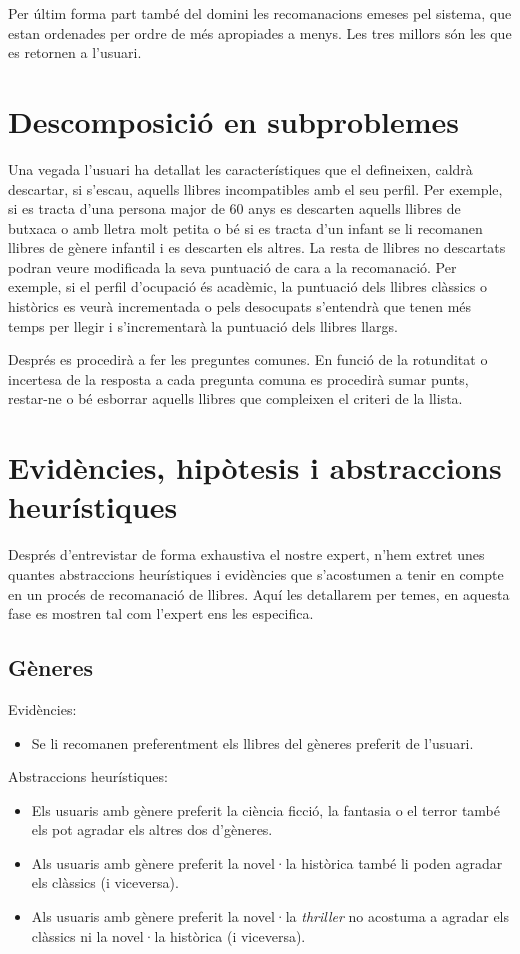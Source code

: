Per últim forma part també del domini les recomanacions emeses pel sistema, que estan ordenades per ordre de més apropiades a menys. Les tres millors són les que es retornen a l'usuari.

\section{Descomposició en subproblemes}

Una vegada l'usuari ha detallat les característiques que el defineixen, caldrà descartar, si s'escau, aquells llibres incompatibles amb el seu perfil. Per exemple, si es tracta d'una persona major de 60 anys es descarten aquells llibres de butxaca o amb lletra molt petita o bé si es tracta d'un infant se li recomanen llibres de gènere infantil i es descarten els altres. La resta de llibres no descartats podran veure modificada la seva puntuació de cara a la recomanació. Per exemple, si el perfil d'ocupació és acadèmic, la puntuació dels llibres clàssics o històrics es veurà incrementada o pels desocupats s'entendrà que tenen més temps per llegir i s'incrementarà la puntuació dels llibres llargs. 

Després es procedirà a fer les preguntes comunes. En funció de la rotunditat o incertesa de la resposta a cada pregunta comuna es procedirà sumar punts, restar-ne o bé esborrar aquells llibres que compleixen el criteri de la llista.

\section{Evidències, hipòtesis i abstraccions heurístiques}

Després d'entrevistar de forma exhaustiva el nostre expert, n'hem extret unes quantes abstraccions heurístiques i evidències que s'acostumen a tenir en compte en un procés de recomanació de llibres. Aquí les detallarem per temes, en aquesta fase es mostren tal com l'expert ens les especifica.

\subsection{Gèneres}
Evidències:
\begin{itemize}
  \item Se li recomanen preferentment els llibres del gèneres preferit de l'usuari.
\end{itemize}
Abstraccions heurístiques:
\begin{itemize}
  \item Els usuaris amb gènere preferit la ciència ficció, la fantasia o el terror també els pot agradar els altres dos d'gèneres.
  \item Als usuaris amb gènere preferit la novel·la històrica també li poden agradar els clàssics (i viceversa).
  \item Als usuaris amb gènere preferit la novel·la \emph{thriller} no acostuma a agradar els clàssics ni la novel·la històrica (i viceversa).
\end{itemize}

